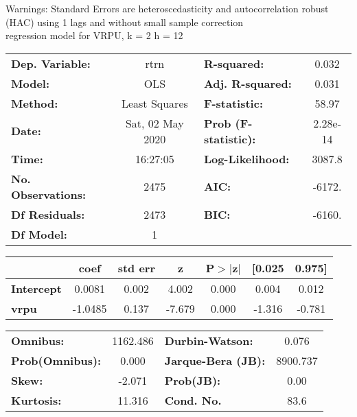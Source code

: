 Warnings: \newline
 [1] Standard Errors are heteroscedasticity and autocorrelation robust (HAC) using 1 lags and without small sample correction\\ 

regression model for VRPU, k = 2 h = 12\begin{center}
\begin{tabular}{lclc}
\toprule
\textbf{Dep. Variable:}    &       rtrn       & \textbf{  R-squared:         } &     0.032   \\
\textbf{Model:}            &       OLS        & \textbf{  Adj. R-squared:    } &     0.031   \\
\textbf{Method:}           &  Least Squares   & \textbf{  F-statistic:       } &     58.97   \\
\textbf{Date:}             & Sat, 02 May 2020 & \textbf{  Prob (F-statistic):} &  2.28e-14   \\
\textbf{Time:}             &     16:27:05     & \textbf{  Log-Likelihood:    } &    3087.8   \\
\textbf{No. Observations:} &        2475      & \textbf{  AIC:               } &    -6172.   \\
\textbf{Df Residuals:}     &        2473      & \textbf{  BIC:               } &    -6160.   \\
\textbf{Df Model:}         &           1      & \textbf{                     } &             \\
\bottomrule
\end{tabular}
\begin{tabular}{lcccccc}
                   & \textbf{coef} & \textbf{std err} & \textbf{z} & \textbf{P$> |$z$|$} & \textbf{[0.025} & \textbf{0.975]}  \\
\midrule
\textbf{Intercept} &       0.0081  &        0.002     &     4.002  &         0.000        &        0.004    &        0.012     \\
\textbf{vrpu}      &      -1.0485  &        0.137     &    -7.679  &         0.000        &       -1.316    &       -0.781     \\
\bottomrule
\end{tabular}
\begin{tabular}{lclc}
\textbf{Omnibus:}       & 1162.486 & \textbf{  Durbin-Watson:     } &    0.076  \\
\textbf{Prob(Omnibus):} &   0.000  & \textbf{  Jarque-Bera (JB):  } & 8900.737  \\
\textbf{Skew:}          &  -2.071  & \textbf{  Prob(JB):          } &     0.00  \\
\textbf{Kurtosis:}      &  11.316  & \textbf{  Cond. No.          } &     83.6  \\
\bottomrule
\end{tabular}
\end{center}

